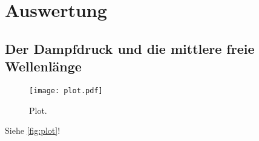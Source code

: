 \section{Auswertung}
\label{sec:Auswertung}

\subsection{Der Dampfdruck und die mittlere freie Wellenlänge}


\begin{figure}
  \centering
  \texttt{[image: plot.pdf]}
  \caption{Plot.}
  \label{fig:plot}
\end{figure}


Siehe \autoref{fig:plot}!
